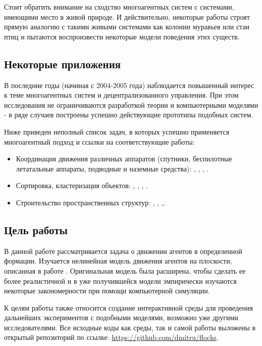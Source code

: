 Стоит обратить внимание на сходство многоагентных систем с системами, имеющими место в живой природе. И действительно, некоторые работы строят прямую аналогию с  такими живыми системами как колонии муравьев или стаи птиц и пытаются воспроизвести некоторые модели поведения этих существ.

\subsection*{Некоторые приложения}

В последние годы (начиная с 2004-2005 года) наблюдается
повышенный интерес к теме многоагентных систем и
децентрализованного управления. При этом исследования
не ограничиваются разработкой теории и компьютерными
моделями - в ряде случаев построены успешно
действующие прототипы подобных систем. 

Ниже приведен неполный список задач, в которых успешно  применяется многоагентный подход и ссылки на соответствующие работы:
\begin{itemize}
\item Координация движения различных аппаратов (спутники, беспилотные летатальные аппараты, подводные и наземные средства): \cite{lafferriere2005decentralized}, \cite{veerman2005flocks}, \cite{vasarhelyi2014outdoor}, \cite{williams2005stable}.
\item Сортировка, кластеризация объектов: \cite{deneubourg1991dynamics}, \cite{ding2014sorting}, \cite{kabla2012collective}, \cite{santos2014segregation}.
\item Строительство пространственных структур: \cite{pennisi2014cooperative}, \cite{petersen2014collective}, \cite{augugliaro2013building},\cite{lindsey2011construction}.
\end{itemize}

\subsection*{Цель работы}

В данной работе рассматривается задача о движении агентов в определенной формации. Изучается нелинейная модель движения агентов на плоскости, описанная в работе \cite{veerman2005flocks}. Оригинальная модель была расширена, чтобы сделать ее более реалистичной и в уже получившейся модели эмпирически изучаются некоторые закономерности при помощи компьютерной симуляции.

К целям работы также относится создание интерактивной среды для проведения дальнейших экспериментов с подобными моделями, возможно уже другими исследователями. Все исходные коды как среды, так и самой работы выложены в открытый репозиторий по ссылке:
\url{https://github.com/dmitru/flocks}.

\clearpage